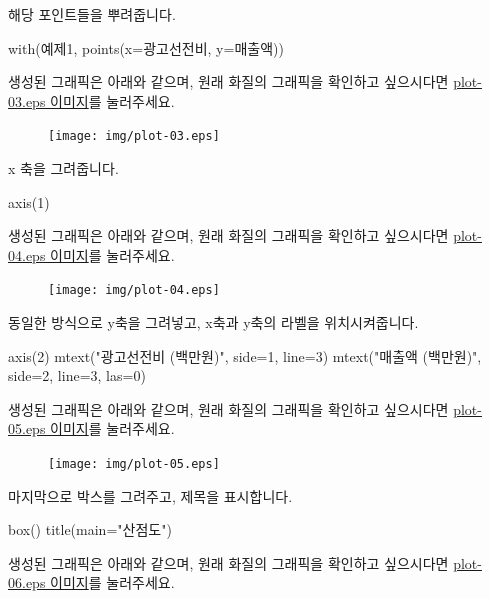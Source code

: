 \documentclass[../tutorial.tex]{subfiles}
\begin{document}
해당 포인트들을 뿌려줍니다.
\begin{Schunk}
\begin{Soutput}	
with(예제1, points(x=광고선전비, y=매출액))
\end{Soutput}
\end{Schunk}
생성된 그래픽은 아래와 같으며, 원래 화질의 그래픽을 확인하고 싶으시다면 \href{http://korea.gnu.org/gnustats/img/plot-03.eps}{plot-03.eps 이미지}를 눌러주세요. 

\begin{figure}
\begin{center}
\texttt{[image: img/plot-03.eps]}
\end{center}
\end{figure}

x 축을 그려줍니다. 
\begin{Schunk}
\begin{Soutput}	
axis(1)
\end{Soutput}
\end{Schunk}
생성된 그래픽은 아래와 같으며, 원래 화질의 그래픽을 확인하고 싶으시다면 \href{http://korea.gnu.org/gnustats/img/plot-04.eps}{plot-04.eps 이미지}를 눌러주세요. 

\begin{figure}
\begin{center}
\texttt{[image: img/plot-04.eps]}
\end{center}
\end{figure}

동일한 방식으로 y축을 그려넣고, x축과 y축의 라벨을 위치시켜줍니다. 
\begin{Schunk}
\begin{Soutput}	
axis(2)
mtext("광고선전비 (백만원)", side=1, line=3)
mtext("매출액 (백만원)", side=2, line=3, las=0)
\end{Soutput}
\end{Schunk}
생성된 그래픽은 아래와 같으며, 원래 화질의 그래픽을 확인하고 싶으시다면 \href{http://korea.gnu.org/gnustats/img/plot-05.eps}{plot-05.eps 이미지}를 눌러주세요. 

\begin{figure}
\begin{center}
\texttt{[image: img/plot-05.eps]}
\end{center}
\end{figure}


마지막으로 박스를 그려주고, 제목을 표시합니다. 
\begin{Schunk}
\begin{Soutput}	
box()
title(main="산점도")
\end{Soutput}
\end{Schunk}
생성된 그래픽은 아래와 같으며, 원래 화질의 그래픽을 확인하고 싶으시다면 \href{http://korea.gnu.org/gnustats/img/plot-06.eps}{plot-06.eps 이미지}를 눌러주세요. 
\end{document}
